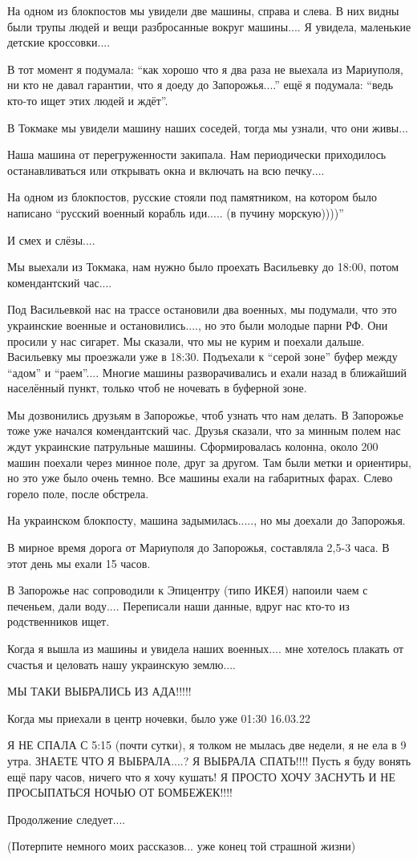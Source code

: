 На одном из блокпостов мы увидели две машины, справа и слева. В них видны были
трупы людей и вещи разбросанные вокруг машины.... Я увидела, маленькие детские
кроссовки....

В тот момент я подумала: \enquote{как хорошо что я два раза не выехала из Мариуполя, ни
кто не давал гарантии, что я доеду до Запорожья....} ещё я подумала: \enquote{ведь кто-то
ищет этих людей и ждёт}.

В Токмаке мы увидели машину наших соседей, тогда мы узнали, что они живы...

Наша машина от перегруженности закипала. Нам периодически приходилось
останавливаться или открывать окна и включать на всю печку....

На одном из блокпостов, русские стояли под памятником, на котором было написано
\enquote{русский военный корабль иди..... (в пучину морскую))))}

И смех и слёзы....

Мы выехали из Токмака, нам нужно было проехать Васильевку до 18:00, потом
комендантский час....

Под Васильевкой нас на трассе остановили два военных, мы подумали, что это
украинские военные и остановились...., но это были молодые парни РФ. Они просили
у нас сигарет. Мы сказали, что мы не курим и поехали дальше. Васильевку мы
проезжали уже в 18:30. Подъехали к \enquote{серой зоне} буфер между \enquote{адом} и \enquote{раем}....
Многие машины разворачивались и ехали назад в ближайший населённый пункт,
только чтоб не ночевать в буферной зоне. 

Мы дозвонились друзьям в Запорожье, чтоб узнать что нам делать. В Запорожье
тоже уже начался комендантский час. Друзья сказали, что за минным полем нас
ждут украинские патрульные машины. Сформировалась колонна, около 200 машин
поехали через минное поле, друг за другом. Там были метки и ориентиры, но это
уже было очень темно. Все машины ехали на габаритных фарах. Слево горело поле,
после обстрела. 

На украинском блокпосту, машина задымилась....., но мы доехали до Запорожья. 

В мирное время дорога от Мариуполя до Запорожья, составляла 2,5-3 часа. В этот
день мы ехали 15 часов. 

В Запорожье нас сопроводили к Эпицентру (типо ИКЕЯ) напоили чаем с печеньем,
дали воду....  Переписали наши данные, вдруг нас кто-то из родственников ищет. 

Когда я вышла из машины и увидела наших военных.... мне хотелось плакать от
счастья и целовать нашу украинскую землю....

МЫ ТАКИ ВЫБРАЛИСЬ ИЗ АДА!!!!!

Когда мы приехали в центр ночевки, было уже 01:30 16.03.22

Я НЕ СПАЛА С 5:15 (почти сутки), я толком не мылась две недели, я не ела в 9
утра. ЗНАЕТЕ ЧТО Я ВЫБРАЛА....? Я ВЫБРАЛА СПАТЬ!!!! Пусть я буду вонять ещё пару
часов, ничего что я хочу кушать! Я ПРОСТО ХОЧУ ЗАСНУТЬ И НЕ ПРОСЫПАТЬСЯ НОЧЬЮ
ОТ БОМБЕЖЕК!!!! 

Продолжение следует....

(Потерпите немного моих рассказов... уже конец той страшной жизни)

